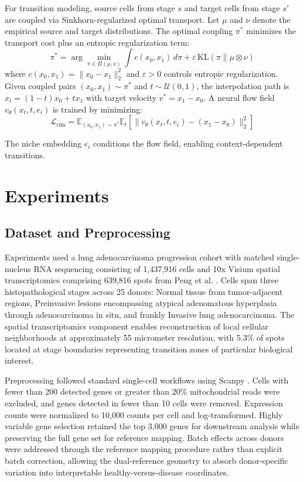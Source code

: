 \documentclass[conference]{IEEEtran}
\begin{document}
For transition modeling, source cells from stage $s$ and target cells from stage $s'$ are coupled via Sinkhorn-regularized optimal transport. Let $\mu$ and $\nu$ denote the empirical source and target distributions. The optimal coupling $\pi^*$ minimizes the transport cost plus an entropic regularization term:
\begin{equation}
\pi^* = \arg\min_{\pi \in \Pi(\mu,\nu)} \int c(x_0, x_1) \, d\pi + \varepsilon \, \text{KL}(\pi \| \mu \otimes \nu)
\end{equation}
where $c(x_0, x_1) = \|x_0 - x_1\|_2^2$ and $\varepsilon > 0$ controls entropic regularization. Given coupled pairs $(x_0, x_1) \sim \pi^*$ and $t \sim \mathcal{U}(0,1)$, the interpolation path is $x_t = (1-t)x_0 + tx_1$ with target velocity $v^* = x_1 - x_0$. A neural flow field $v_\theta(x_t, t, e_i)$ is trained by minimizing:
\begin{equation}
\mathcal{L}_{\text{cfm}} = \mathbb{E}_{(x_0,x_1)\sim\pi^*} \mathbb{E}_{t} \left[\|v_\theta(x_t, t, e_i) - (x_1 - x_0)\|_2^2\right]
\end{equation}

The niche embedding $e_i$ conditions the flow field, enabling context-dependent transitions.

\section{Experiments}

\subsection{Dataset and Preprocessing}

Experiments used a lung adenocarcinoma progression cohort with matched single-nucleus RNA sequencing consisting of 1,437,916 cells and 10x Visium spatial transcriptomics comprising 639,816 spots from Peng et al. \cite{Peng2025-xu}. Cells span three histopathological stages across 25 donors: Normal tissue from tumor-adjacent regions, Preinvasive lesions encompassing atypical adenomatous hyperplasia through adenocarcinoma in situ, and frankly Invasive lung adenocarcinoma. The spatial transcriptomics component enables reconstruction of local cellular neighborhoods at approximately 55 micrometer resolution, with 5.3\% of spots located at stage boundaries representing transition zones of particular biological interest.

Preprocessing followed standard single-cell workflows using Scanpy \cite{Virshup2023-tt}. Cells with fewer than 200 detected genes or greater than 20\% mitochondrial reads were excluded, and genes detected in fewer than 10 cells were removed. Expression counts were normalized to 10,000 counts per cell and log-transformed. Highly variable gene selection retained the top 3,000 genes for downstream analysis while preserving the full gene set for reference mapping. Batch effects across donors were addressed through the reference mapping procedure rather than explicit batch correction, allowing the dual-reference geometry to absorb donor-specific variation into interpretable healthy-versus-disease coordinates.
\end{document}

